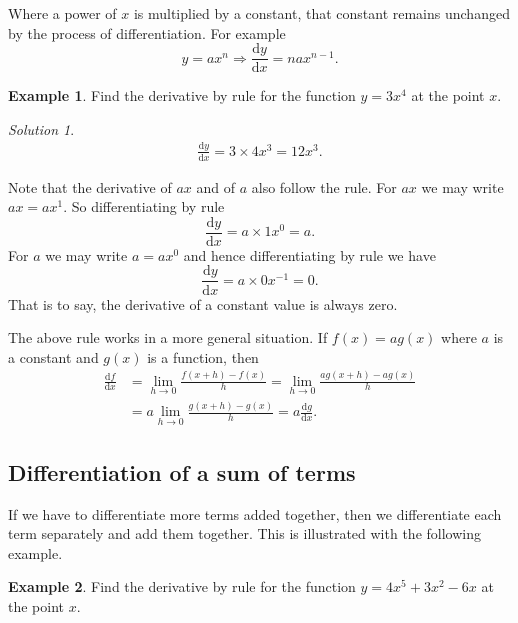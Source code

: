 \documentclass[
  english,
  11pt,
  oneside]{book}
\newcommand{\slide}{}
\theoremstyle{definition}
\theoremstyle{definition}
\newtheorem{example}{Example}[chapter]
\theoremstyle{definition}
\theoremstyle{definition}
\theoremstyle{remark}
\newtheorem*{solution}{Solution}
\begin{document}
Where a power of \(x\) is multiplied by a constant, that constant remains unchanged by the process of differentiation. For example
\[y = ax^n \Rightarrow \frac{\mathrm{d} y}{\mathrm{d} x} = nax^{n-1}.\]

\begin{example}
Find the derivative by rule for the function \(y = 3x^4\) at the point \(x\).
\end{example}

\begin{solution}
\begin{gather*}
\frac{\mathrm{d} y}{\mathrm{d} x} = 3\times4x^3 = 12 x^3.
\end{gather*}
\end{solution}

\slide

Note that the derivative of \(ax\) and of \(a\) also follow the rule. For \(ax\) we may write \(ax = ax^1\). So differentiating by rule
\[\frac{\mathrm{d} y}{\mathrm{d} x} = a\times1x^0 = a.\]
For \(a\) we may write \(a = ax^0\) and hence differentiating by rule we have
\[\frac{\mathrm{d} y}{\mathrm{d} x} = a\times0x^{-1} = 0.\]
That is to say, the derivative of a constant value is always zero.

\slide

The above rule works in a more general situation. If \(f(x) = ag(x)\) where \(a\) is a constant and \(g(x)\) is a function, then
\begin{align*}
\frac{\mathrm{d} f}{\mathrm{d} x} &= \lim\limits_{h\to0}\frac{f(x+h)-f(x)}{h} = \lim\limits_{h\to0}\frac{ag(x+h)-ag(x)}{h} \\ &= a\lim\limits_{h\to0}\frac{g(x+h)-g(x)}{h} = a\frac{\mathrm{d} g}{\mathrm{d} x}.
\end{align*}

\slide

\subsection{Differentiation of a sum of terms}\label{differentiation-of-a-sum-of-terms}

If we have to differentiate more terms added together, then we differentiate each term separately and add them together. This is illustrated with the following example.

\begin{example}
Find the derivative by rule for the function \(y = 4x^5+3x^2-6x\) at the point \(x\).
\end{example}
\end{document}
